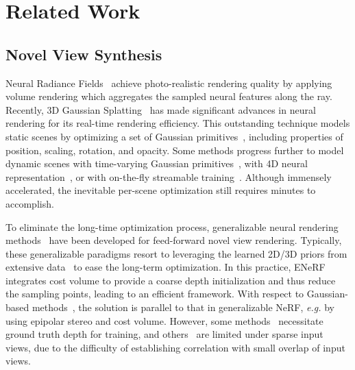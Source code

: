 
\section{Related Work}

\subsection{Novel View Synthesis}

Neural Radiance Fields~\cite{mildenhall2020nerf,barron2021mip} achieve photo-realistic rendering quality by applying volume rendering which aggregates the sampled neural features along the ray. 
%
Recently, 3D Gaussian Splatting~\cite{kerbl2023_3dgs} has made significant advances in neural rendering for its real-time rendering efficiency.
%
This outstanding technique models static scenes by optimizing a set of Gaussian primitives~\cite{kerbl2023_3dgs, lu2024scaffold, yu2024mip}, including properties of position, scaling, rotation, and opacity. 
%
Some methods progress further to model dynamic scenes with time-varying Gaussian primitives~\cite{li2024spacetime, yang2024deformable, yan2024street, sun2025splatter}, with 4D neural representation~\cite{Wu2024_4dgs, xu20244k4d, xu2024representing}, or with on-the-fly streamable training~\cite{luiten2023dynamic, sun20243dgstream, girish2025queen, gao2025hicom}.
%
Although immensely accelerated, the inevitable per-scene optimization still requires minutes to accomplish.

To eliminate the long-time optimization process, generalizable neural rendering methods~\cite{wang2021ibrnet, yu2021pixelnerf, charatan2023pixelsplat, zheng2024gpsgaussian} have been developed for feed-forward novel view rendering.
%
Typically, these generalizable paradigms resort to leveraging the learned 2D/3D priors from extensive data~\cite{zhou2018stereo, liu2021infinite, yu2021function4d} to ease the long-term optimization.
%
In this practice, ENeRF~\cite{lin2022enerf} integrates cost volume to provide a coarse depth initialization and thus reduce the sampling points, leading to an efficient framework.
%
With respect to Gaussian-based methods~\cite{xu2024depthsplat, charatan2023pixelsplat, zheng2024gpsgaussian, liu2024mvsgaussian}, the solution is parallel to that in generalizable NeRF, \textit{e.g.} by using epipolar stereo and cost volume.
%
However, some methods~\cite{zheng2024gpsgaussian} necessitate ground truth depth for training, and others~\cite{charatan2023pixelsplat, chen2024mvsplat, zhou2024gps} are limited under sparse input views, due to the difficulty of establishing correlation with small overlap of input views.


